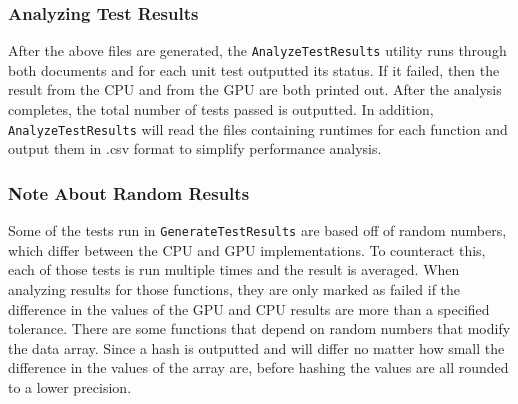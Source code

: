 \documentclass[12pt]{article}
\begin{document}
\subsubsection{Analyzing Test Results}
After the above files are generated, the \texttt{AnalyzeTestResults} utility runs through both documents and for each unit test outputted its status. If it failed, then the result from the CPU and from the GPU are both printed out. After the analysis completes, the total number of tests passed is outputted. In addition, \texttt{AnalyzeTestResults} will read the files containing runtimes for each function and output them in .csv format to simplify performance analysis.

\subsubsection{Note About Random Results}
Some of the tests run in \texttt{GenerateTestResults} are based off of random numbers, which differ between the CPU and GPU implementations. To counteract this, each of those tests is run multiple times and the result is averaged. When analyzing results for those functions, they are only marked as failed if the difference in the values of the GPU and CPU results are more than a specified tolerance. There are some functions that depend on random numbers that modify the data array. Since a hash is outputted and will differ no matter how small the difference in the values of the array are, before hashing the values are all rounded to a lower precision.
\end{document}

